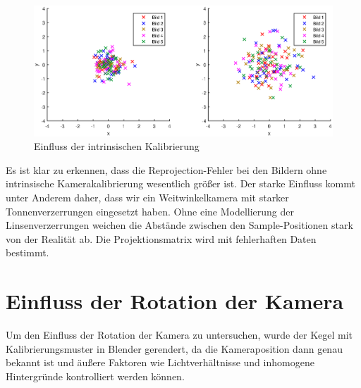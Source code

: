\begin{figure}[!htb]
	\centering
	\includegraphics[width=\textwidth]{images/reprojectionErrorReverse.eps}
	\caption{Einfluss der intrinsischen Kalibrierung}
	\label{fig:influenceCalib}
\end{figure}


Es ist klar zu erkennen, dass die Reprojection-Fehler bei den Bildern ohne intrinsische Kamerakalibrierung wesentlich größer ist. Der starke Einfluss kommt unter Anderem daher, dass wir ein Weitwinkelkamera mit starker Tonnenverzerrungen eingesetzt haben. Ohne eine Modellierung der Linsenverzerrungen weichen die Abstände zwischen den Sample-Positionen stark von der Realität ab. Die Projektionsmatrix wird mit fehlerhaften Daten bestimmt. 

\section{Einfluss der Rotation der Kamera}
Um den Einfluss der Rotation der Kamera zu untersuchen, wurde der Kegel mit Kalibrierungsmuster in Blender gerendert, da die Kameraposition dann genau bekannt ist und äußere Faktoren wie Lichtverhältnisse und inhomogene Hintergründe kontrolliert werden können. 

